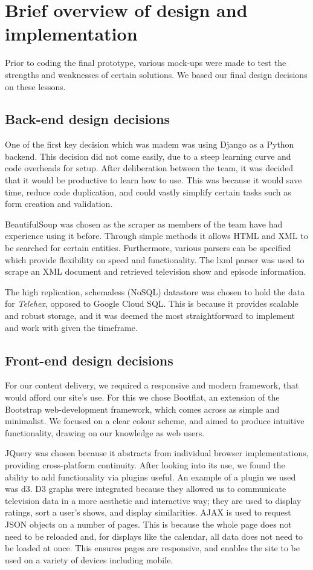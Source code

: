 \documentclass[12pt, a4paper]{article}
\begin{document}
\newpage
\section{Brief overview of design and implementation}
Prior to coding the final prototype, various mock-ups were made to test the strengths and weaknesses of certain solutions. We based our final design decisions on these lessons.

\subsection{Back-end design decisions}

One of the first key decision which was madem was using Django as a Python backend. This decision did not come easily, due to a steep learning curve and code overheads for setup. After deliberation between the team, it was decided that it would be productive to learn how to use. This was because it would save time, reduce code duplication, and could vastly simplify certain tasks such as form creation and validation.

BeautifulSoup was chosen as the scraper as members of the team have had experience using it before. Through simple methods it allows HTML and XML to be searched for certain entities. Furthermore, various parsers can be specified which provide flexibility on speed and functionality. The lxml parser was used to scrape an XML document and retrieved television show and episode information.

The high replication, schemaless (NoSQL) datastore was chosen to hold the data for \textit{Telehex}, opposed to Google Cloud SQL. This is because it provides scalable and robust storage, and it was deemed the most straightforward to implement and work with given the timeframe.


\subsection{Front-end design decisions}

For our content delivery, we required a responsive and modern framework, that would afford our site's use. For this we chose Bootflat, an extension of the Bootstrap web-development framework, which comes across as simple and minimalist. We focused on a clear colour scheme, and aimed to produce intuitive functionality, drawing on our knowledge as web users. 

JQuery was chosen because it abstracts from individual browser implementations, providing cross-platform continuity. After looking into its use, we found the ability to add functionality via plugins useful. An example of a plugin we used was d3. D3 graphs were integrated because they allowed us to communicate television data in a more aesthetic and interactive way; they are used to display ratings, sort a user's shows, and display similarities. AJAX is used to request JSON objects on a number of pages. This is because the whole page does not need to be reloaded and, for displays like the calendar, all data does not need to be loaded at once. This ensures pages are responsive, and enables the site to be used on a variety of devices including mobile.
\end{document}
